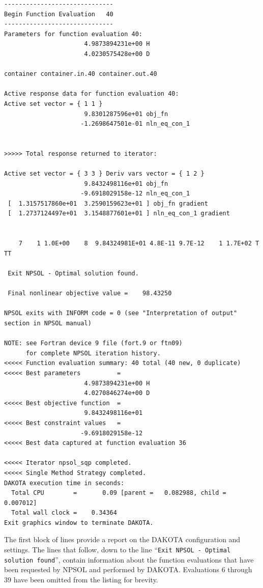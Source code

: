 \begin{small}
\begin{verbatim}
------------------------------
Begin Function Evaluation   40
------------------------------
Parameters for function evaluation 40:
                      4.9873894231e+00 H
                      4.0230575428e+00 D

container container.in.40 container.out.40

Active response data for function evaluation 40:
Active set vector = { 1 1 }
                      9.8301287596e+01 obj_fn
                     -1.2698647501e-01 nln_eq_con_1


>>>>> Total response returned to iterator:

Active set vector = { 3 3 } Deriv vars vector = { 1 2 }
                      9.8432498116e+01 obj_fn
                     -9.6918029158e-12 nln_eq_con_1
 [  1.3157517860e+01  3.2590159623e+01 ] obj_fn gradient
 [  1.2737124497e+01  3.1548877601e+01 ] nln_eq_con_1 gradient


    7    1 1.0E+00    8  9.84324981E+01 4.8E-11 9.7E-12    1 1.7E+02 T TT     

 Exit NPSOL - Optimal solution found.

 Final nonlinear objective value =    98.43250    

NPSOL exits with INFORM code = 0 (see "Interpretation of output" section in NPSOL manual)

NOTE: see Fortran device 9 file (fort.9 or ftn09)
      for complete NPSOL iteration history.
<<<<< Function evaluation summary: 40 total (40 new, 0 duplicate)
<<<<< Best parameters          =
                      4.9873894231e+00 H
                      4.0270846274e+00 D
<<<<< Best objective function  =
                      9.8432498116e+01
<<<<< Best constraint values   =
                     -9.6918029158e-12
<<<<< Best data captured at function evaluation 36

<<<<< Iterator npsol_sqp completed.
<<<<< Single Method Strategy completed.
DAKOTA execution time in seconds:
  Total CPU        =       0.09 [parent =   0.082988, child =   0.007012]
  Total wall clock =    0.34364
Exit graphics window to terminate DAKOTA.
\end{verbatim}
\end{small}

The first block of lines provide a report on the DAKOTA configuration
and settings. The lines that follow, down to the line 
``\texttt{Exit  NPSOL - Optimal solution found}'', contain information
about the function evaluations that have been requested by NPSOL and
performed by DAKOTA. Evaluations 6 through 39 have been omitted from
the listing for brevity.

